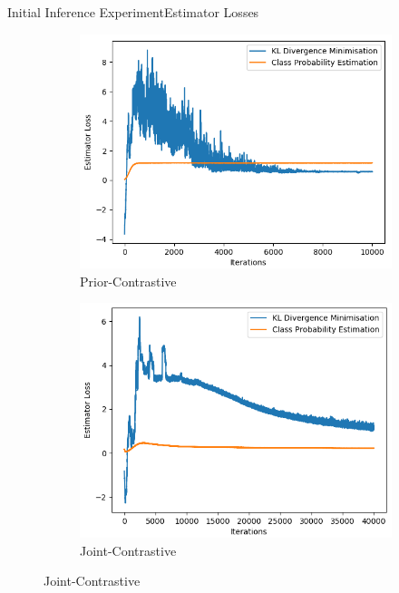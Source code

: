 \documentclass{beamer}
\begin{document}
\begin{frame}{Initial Inference Experiment}{Estimator Losses}
\begin{figure}
\begin{subfigure}{0.49\textwidth}
\includegraphics[width=\linewidth]{estimator_losses/PCKLvsPCADV.png}
\caption{Prior-Contrastive}
\end{subfigure}
\begin{subfigure}{0.49\textwidth}
\includegraphics[width=\linewidth]{estimator_losses/JCKLvsJCADV.png}
\caption{Joint-Contrastive}
\end{subfigure}
\end{figure}
\end{frame}
\end{document}
